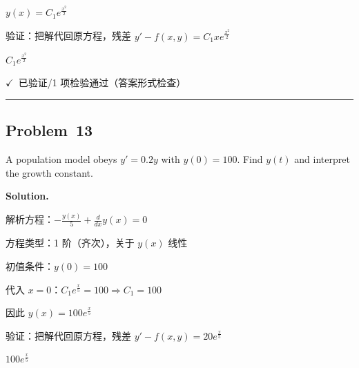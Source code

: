 \documentclass[12pt, a4paper]{article}
\newcommand{\problem}[1]{\subsection*{Problem~#1}}
\newcommand{\solution}{%
  \par\noindent
  {\color{solutiongreen}\bfseries Solution.}\par
}
\newcommand{\verifyok}{\textcolor{solutiongreen}{\ensuremath{\checkmark}\ 已验证}}
\begin{document}
\begin{stepbox}
$y(x) = C_{1} e^{\frac{x^{2}}{2}}$
\end{stepbox}

\begin{stepbox}
验证：把解代回原方程，残差 $y' - f(x,y) = C_{1} x e^{\frac{x^{2}}{2}}$
\end{stepbox}

\begin{center}
$\boxed{C_{1} e^{\frac{x^{2}}{2}}}$
\end{center}

\begin{verifybox}\small \verifyok{}/1 项检验通过（答案形式检查） \end{verifybox}

\vspace{0.8em}\hrule\vspace{0.8em}

\problem{13}

\begin{stepbox}
A population model obeys $y' = 0.2y$ with $y(0) = 100$. Find $y(t)$ and
interpret the growth constant.
\end{stepbox}

\solution

\begin{stepbox}
解析方程：$- \frac{y{\left(x \right)}}{5} + \frac{d}{d x} y{\left(x \right)} = 0$
\end{stepbox}

\begin{stepbox}
方程类型：1 阶（齐次），关于 $y(x)$ 线性
\end{stepbox}

\begin{stepbox}
初值条件：$y(0) = 100$
\end{stepbox}

\begin{stepbox}
代入 $x = 0$：$C_{1} e^{\frac{x}{5}} = 100$$\Rightarrow C_{1} = 100$
\end{stepbox}

\begin{stepbox}
因此 $y(x) = 100 e^{\frac{x}{5}}$
\end{stepbox}

\begin{stepbox}
验证：把解代回原方程，残差 $y' - f(x,y) = 20 e^{\frac{x}{5}}$
\end{stepbox}

\begin{center}
$\boxed{100 e^{\frac{x}{5}}}$
\end{center}
\end{document}
